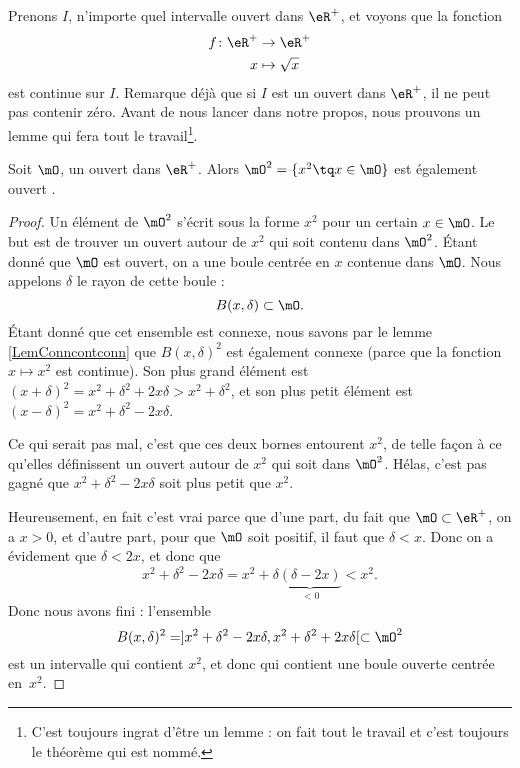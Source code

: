\documentclass{article}
\begin{document}
Prenons $I$, n'importe quel intervalle ouvert dans $\eR^+$, et voyons que la fonction
\begin{equation}
\begin{aligned}
 f\colon \eR^+&\to \eR^+ \\ 
   x&\mapsto \sqrt{x} 
\end{aligned}
\end{equation}
est continue sur $I$. Remarque déjà que si $I$ est un ouvert dans $\eR^+$, il ne peut pas contenir zéro. Avant de nous lancer dans notre propos, nous prouvons un lemme qui fera tout le travail\footnote{C'est toujours ingrat d'être un lemme : on fait tout le travail et c'est toujours le théorème qui est nommé.}.

\begin{lemma}
Soit $\mO$, un ouvert dans $\eR^+$. Alors $\mO^2=\{ x^2\tq x\in\mO \}$ est également ouvert .
\end{lemma}

\begin{proof}
Un élément de $\mO^2$ s'écrit sous la forme $x^2$ pour un certain $x\in\mO$. Le but est de trouver un ouvert autour de $x^2$ qui soit contenu dans $\mO^2$. Étant donné que $\mO$ est ouvert, on a une boule centrée en $x$ contenue dans $\mO$. Nous appelons $\delta$ le rayon de cette boule :
\[ 
  B(x,\delta)\subset\mO.
\]
Étant donné que cet ensemble est connexe, nous savons par le lemme \ref{LemConncontconn} que $B(x,\delta)^2$ est également connexe (parce que la fonction $x\mapsto x^2$ est continue). Son plus grand élément est $(x+\delta)^2=x^2+\delta^2+2x\delta>x^2+\delta^2$, et son plus petit élément est $(x-\delta)^2=x^2+\delta^2-2x\delta$. 

Ce qui serait pas mal, c'est que ces deux bornes entourent $x^2$, de telle façon à ce qu'elles définissent un ouvert autour de $x^2$ qui soit dans $\mO^2$. Hélas, c'est pas gagné que $x^2+\delta^2-2x\delta$ soit plus petit que $x^2$. 

Heureusement, en fait c'est vrai parce que d'une part, du fait que $\mO\subset\eR^+$, on a $x>0$, et d'autre part, pour que $\mO$ soit positif, il faut que $\delta<x$. Donc on a évidement que $\delta<2x$, et donc que
\[ 
  x^2+\delta^2-2x\delta=x^2+\delta\underbrace{(\delta-2x)}_{<0}<x^2.
\]
Donc nous avons fini : l'ensemble
\[ 
  B(x,\delta)^2=]x^2+\delta^2-2x\delta,x^2+\delta^2+2x\delta[\subset\mO^2
\]
est un intervalle qui contient $x^2$, et donc qui contient une boule ouverte centrée en~$x^2$.

\end{proof}
\end{document}
